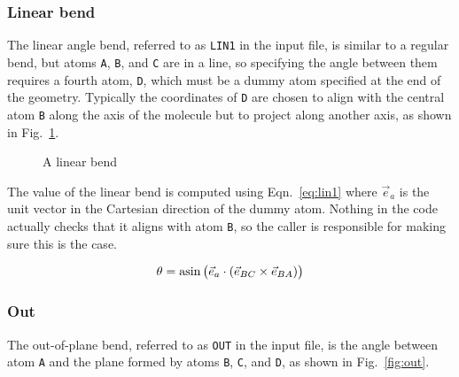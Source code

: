 \documentclass{article}
\begin{document}
\subsubsection{Linear bend}
\label{sec:lin1}

The linear angle bend, referred to as \verb|LIN1| in the input file, is similar
to a regular bend, but atoms \verb|A|, \verb|B|, and \verb|C| are in a line, so
specifying the angle between them requires a fourth atom, \verb|D|, which must
be a dummy atom specified at the end of the geometry. Typically the coordinates
of \verb|D| are chosen to align with the central atom \verb|B| along the axis of
the molecule but to project along another axis, as shown in Fig.~\ref{fig:lin1}.

\begin{figure}[ht]
  \centering
  \caption{A linear bend}
  \label{fig:lin1}

\end{figure}

The value of the linear bend is computed using Eqn.~\ref{eq:lin1} where
$\vec{e}_a$ is the unit vector in the Cartesian direction of the dummy atom.
Nothing in the code actually checks that it aligns with atom \verb|B|, so the
caller is responsible for making sure this is the case.

\begin{equation}
  \label{eq:lin1}
  \theta = \asin \big( \vec{e}_a \cdot (\vec{e}_{BC} \times \vec{e}_{BA}) \big)
\end{equation}

\subsubsection{Out}
\label{sec:out}

The out-of-plane bend, referred to as \verb|OUT| in the input file, is the angle
between atom \verb|A| and the plane formed by atoms \verb|B|, \verb|C|, and
\verb|D|, as shown in Fig.~\ref{fig:out}.
\end{document}
